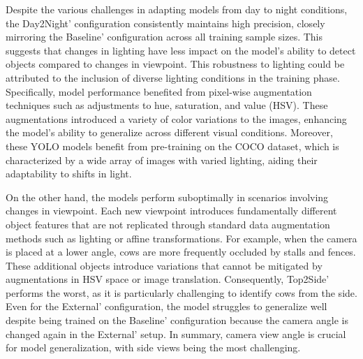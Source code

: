 Despite the various challenges in adapting models from day to night conditions, the Day2Night' configuration consistently maintains high precision, closely mirroring the Baseline' configuration across all training sample sizes. This suggests that changes in lighting have less impact on the model's ability to detect objects compared to changes in viewpoint. This robustness to lighting could be attributed to the inclusion of diverse lighting conditions in the training phase. Specifically, model performance benefited from pixel-wise augmentation techniques such as adjustments to hue, saturation, and value (HSV). These augmentations introduced a variety of color variations to the images, enhancing the model's ability to generalize across different visual conditions. Moreover, these YOLO models benefit from pre-training on the COCO dataset, which is characterized by a wide array of images with varied lighting, aiding their adaptability to shifts in light.

On the other hand, the models perform suboptimally in scenarios involving changes in viewpoint. Each new viewpoint introduces fundamentally different object features that are not replicated through standard data augmentation methods such as lighting or affine transformations. For example, when the camera is placed at a lower angle, cows are more frequently occluded by stalls and fences. These additional objects introduce variations that cannot be mitigated by augmentations in HSV space or image translation. Consequently, Top2Side' performs the worst, as it is particularly challenging to identify cows from the side. Even for the External' configuration, the model struggles to generalize well despite being trained on the Baseline' configuration because the camera angle is changed again in the External' setup. In summary, camera view angle is crucial for model generalization, with side views being the most challenging.


